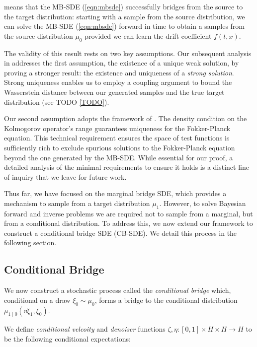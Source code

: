  means that the MB-SDE (\ref{eqn:mbsde}) successfully bridges from the source to the target distribution: starting with a sample from the source distribution, we can solve the MB-SDE (\ref{eqn:mbsde}) forward in time to obtain a samples from the source distribution \(\mu_{0}\) provided we can learn the drift coefficient \(f(t, x)\).

The validity of this result rests on two key assumptions. Our subsequent analysis in  addresses the first assumption, the existence of a unique weak solution, by proving a stronger result: the existence and uniqueness of a \textit{strong solution}. Strong uniqueness enables us to employ a coupling argument to bound the Wasserstein distance between our generated samples and the true target distribution (see TODO \ref{TODO}). %

Our second assumption adopts the framework of \citet[][Theorem 2.1]{bogachev2010uniquenesssolutionsfokkerplanckequations}. The density condition on the Kolmogorov operator's range guarantees uniqueness for the Fokker-Planck equation. This technical requirement ensures the space of test functions is sufficiently rich to exclude spurious solutions to the Fokker-Planck equation beyond the one generated by the MB-SDE. While essential for our proof, a detailed analysis of the minimal requirements to ensure it holds is a distinct line of inquiry that we leave for future work.


Thus far, we have focused on the marginal bridge SDE, which provides a mechanism to sample from a target distribution \(\mu_{1}\). However,  to solve Bayesian forward and inverse problems we are required not to sample from a marginal, but from a conditional distribution. To address this, we now extend our framework to construct a conditional bridge SDE (CB-SDE). We detail this process in the following section.

\subsection{Conditional Bridge}\label{ssec:condbridge}
We now construct a stochastic process called the \textit{conditional bridge} which, conditional on a draw \(\xi_{0} \sim \mu_{0}\), forms a bridge to the conditional distribution \(\mu_{1 \mid 0}(\dd{\xi_{1}}, \xi_{0})\).

We define \textit{conditional velcoity} and \textit{denoiser} functions \(\zeta, \eta: [0, 1] \times H \times H \to H\) to be the following conditional expectations:

